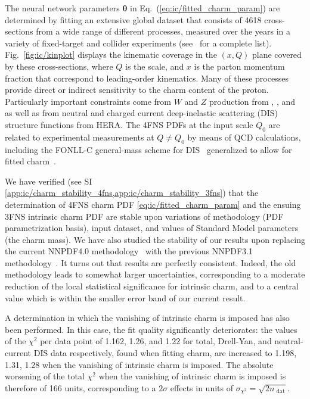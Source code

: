 The neural network parameters ${\boldsymbol \theta}$ in
Eq.~(\ref{eq:ic/fitted_charm_param})
are determined by fitting an extensive global dataset that consists of 4618 
cross-sections from a wide range of different processes, measured over
the years in a variety of fixed-target and collider experiments  (see~\cite{Ball:2021leu} for a complete list).
%
Fig.~\ref{fig:ic/kinplot} displays the kinematic coverage in the $(x,Q)$ plane
covered by these cross-sections, where $Q$ is
the  scale, and  $x$ is
the parton momentum fraction that correspond to leading-order kinematics.
%
Many of these processes provide direct or indirect sensitivity 
to the charm content of the proton.
%
Particularly important constraints come from $W$ and $Z$ production from 
\atlas, \cms, and \lhcb as well as from
neutral and charged current deep-inelastic 
scattering (DIS) structure functions from HERA.
%
The 4FNS  PDFs at the input scale $Q_0$ are related
to experimental measurements at $Q \not =Q_0$ by means of \nnlo QCD calculations, including
the FONLL-C general-mass scheme for DIS~\cite{Forte:2010ta} generalized to 
allow for fitted charm~\cite{Ball:2015tna}.

We have verified (see SI
\cref{app:ic/charm_stability_4fns,app:ic/charm_stability_3fns}) that the
determination of 4FNS charm PDF \cref{eq:ic/fitted_charm_param} and the ensuing
3FNS intrinsic charm PDF are  stable upon variations of methodology (PDF
parametrization basis), input dataset, and values of Standard Model parameters
(the charm mass).
We have also studied the stability of our results upon replacing the
current NNPDF4.0 methodology~\cite{Ball:2021leu} with the previous
NNPDF3.1 methodology~\cite{NNPDF:2017mvq}. It turns out that results
are  perfectly consistent. Indeed, the old methodology leads to somewhat larger
uncertainties, corresponding to a moderate reduction of the local statistical
significance for intrinsic charm, and to a central value which is
within the smaller  error band of our current result.


A determination in which the vanishing of intrinsic charm is
imposed has also been performed.
%
In this case, the fit quality significantly
deteriorates: the values of the $\chi^2$ per data point of 1.162,
1.26, and 1.22 for total, Drell-Yan, 
and neutral-current DIS data respectively, found when fitting charm, are 
increased to 1.198, 1.31, 1.28 when the vanishing of intrinsic charm
is imposed.
%
The absolute worsening of the total $\chi^2$ when the vanishing of intrinsic charm is imposed is therefore
of 166 units, corresponding to
a $2\sigma$ effects in units of $\sigma_{\chi^2}= \sqrt{2n_\textrm{ dat}}$.


